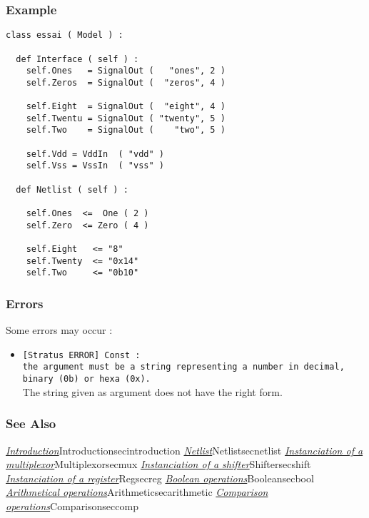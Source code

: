 \subsubsection{Example}

\begin{verbatim}
class essai ( Model ) :

  def Interface ( self ) :
    self.Ones   = SignalOut (   "ones", 2 )
    self.Zeros  = SignalOut (  "zeros", 4 )
    
    self.Eight  = SignalOut (  "eight", 4 )
    self.Twentu = SignalOut ( "twenty", 5 )
    self.Two    = SignalOut (    "two", 5 )

    self.Vdd = VddIn  ( "vdd" )
    self.Vss = VssIn  ( "vss" )
	
  def Netlist ( self ) :
    
    self.Ones  <=  One ( 2 )
    self.Zero  <= Zero ( 4 )
        
    self.Eight   <= "8"
    self.Twenty  <= "0x14"
    self.Two     <= "0b10"
\end{verbatim}
    
\subsubsection{Errors}
    
Some errors may occur :
\begin{itemize}
    \item \verb-[Stratus ERROR] Const :-\\\verb-the argument must be a string representing a number in decimal,-\\\verb-binary (0b) or hexa (0x).-\\The string given as argument does not have the right form.
\end{itemize}

\begin{htmlonly}

\subsubsection{See Also}

\hyperref[ref]{\emph{Introduction}}{}{Introduction}{secintroduction}
\hyperref[ref]{\emph{Netlist}}{}{Netlist}{secnetlist}
\hyperref[ref]{\emph{Instanciation of a multiplexor}}{}{Multiplexor}{secmux}
\hyperref[ref]{\emph{Instanciation of a shifter}}{}{Shifter}{secshift}
\hyperref[ref]{\emph{Instanciation of a register}}{}{Reg}{secreg}
\hyperref[ref]{\emph{Boolean operations}}{}{Boolean}{secbool}
\hyperref[ref]{\emph{Arithmetical operations}}{}{Arithmetic}{secarithmetic}
\hyperref[ref]{\emph{Comparison operations}}{}{Comparison}{seccomp}

\end{htmlonly}

